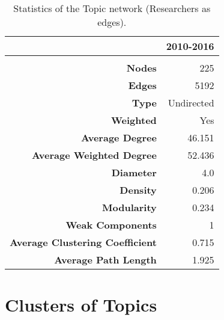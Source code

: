 \begin{table}[!htbp]
\centering
\caption[Statistics of the Topic network (Researchers as edges).]{Statistics of the Topic network (Researchers as edges).}
\label{table:topic_researchers_stats}
\begin{tabular}{r|r}
{} & \textbf{2010-2016}\\
\hline\\
\textbf{Nodes}                          & {225}\\
\textbf{Edges}                          & {5192}\\
\textbf{Type}                           & {Undirected}\\
\textbf{Weighted}                       & {Yes}\\
\textbf{Average Degree}                 & {46.151}\\
\textbf{Average Weighted Degree}        & {52.436}\\
\textbf{Diameter}                       & {4.0}\\
\textbf{Density}                        & {0.206}\\
\textbf{Modularity}                     & {0.234}\\
\textbf{Weak Components}                & {1}\\
\textbf{Average Clustering Coefficient} & {0.715}\\
\textbf{Average Path Length}            & {1.925}\\
\end{tabular}
\end{table}

\section{Clusters of Topics}

